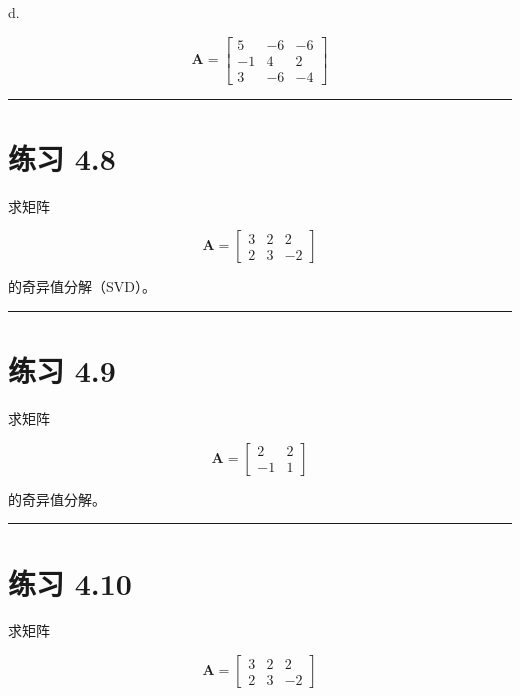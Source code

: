 d.

\begin{equation*}
\boldsymbol{A} = \begin{bmatrix} 5 & -6 & -6 \\ -1 & 4 & 2 \\ 3 & -6 & -4 \end{bmatrix}
\end{equation*}

\medskip\hrule\medskip

\section*{练习 4.8}

求矩阵

\begin{equation*}
\boldsymbol{A} = \begin{bmatrix} 3 & 2 & 2 \\ 2 & 3 & -2 \end{bmatrix}
\end{equation*}

的奇异值分解（SVD）。

\medskip\hrule\medskip

\section*{练习 4.9}

求矩阵

\begin{equation*}
\boldsymbol{A} = \begin{bmatrix} 2 & 2 \\ -1 & 1 \end{bmatrix}
\end{equation*}

的奇异值分解。

\medskip\hrule\medskip

\section*{练习 4.10}

求矩阵

\begin{equation*}
\boldsymbol{A} = \begin{bmatrix} 3 & 2 & 2 \\ 2 & 3 & -2 \end{bmatrix}
\end{equation*}

